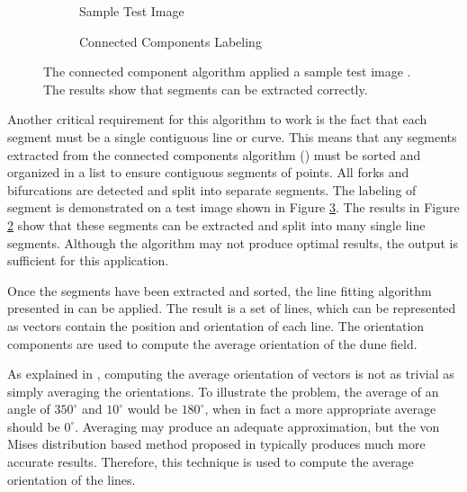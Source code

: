 \begin{figure}
	\centering
	\begin{subfigure}{0.48\textwidth}
		\centering
		\caption{Sample Test Image}
		\label{fig:connected_component_test_image}
	\end{subfigure}
	\begin{subfigure}{0.48\textwidth}
		\centering
		\caption{Connected Components Labeling}
		\label{fig:connected_component_test_results}
	\end{subfigure}
	
	\caption{ The connected component algorithm applied a sample test image . The results  show that segments can be extracted correctly. }
	\label{fig:connected_component_test}
\end{figure}

Another critical requirement for this algorithm to work is the fact that each segment must be a single contiguous line or curve. This means that any segments extracted from the connected components algorithm (\cite{connected-components-samet-tamminen-1988-paper,connected-components-dillencourt-1992-paper}) must be sorted and organized in a list to ensure contiguous segments of points. All forks and bifurcations are detected and split into separate segments. The labeling of segment is demonstrated on a test image shown in Figure \ref{fig:connected_component_test}. The results in Figure \ref{fig:connected_component_test_results} show that these segments can be extracted and split into many single line segments. Although the algorithm may not produce optimal results, the output is sufficient for this application.

Once the segments have been extracted and sorted, the line fitting algorithm presented in \cite{ramer-1972-paper} can be applied. The result is a set of lines, which can be represented as vectors contain the position and orientation of each line. The orientation components are used to compute the average orientation of the dune field.

As explained in \cite{computing-average-orientation-of-vectors}, computing the average orientation of vectors is not as trivial as simply averaging the orientations. To illustrate the problem, the average of an angle of $350^{\circ}$ and $10^{\circ}$ would be $180^{\circ}$, when in fact a more appropriate average should be $0^{\circ}$. Averaging may produce an adequate approximation, but the von Mises distribution based method proposed in \cite{computing-average-orientation-of-vectors} typically produces much more accurate results. Therefore, this technique is used to compute the average orientation of the lines.

